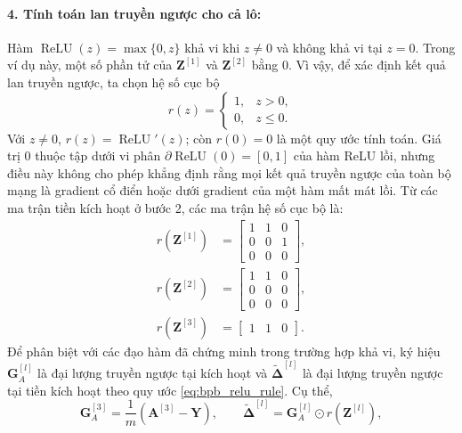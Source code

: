 \paragraph{4. Tính toán lan truyền ngược cho cả lô:}
Hàm $\operatorname{ReLU}(z)=\max\{0,z\}$ khả vi khi $z\neq 0$ và không khả vi tại $z=0$. Trong ví dụ này, một số phần tử của $\mathbf{Z}^{[1]}$ và $\mathbf{Z}^{[2]}$ bằng $0$. Vì vậy, để xác định kết quả lan truyền ngược, ta chọn hệ số cục bộ
\begin{equation}
r(z)=\begin{cases}1,&z>0,\\0,&z\leq 0.\end{cases}
\label{eq:bpb_relu_rule}
\end{equation}
Với $z\neq 0$, $r(z)=\operatorname{ReLU}'(z)$; còn $r(0)=0$ là một quy ước tính toán. Giá trị $0$ thuộc tập dưới vi phân $\partial\operatorname{ReLU}(0)=[0,1]$ của hàm ReLU lồi, nhưng điều này không cho phép khẳng định rằng mọi kết quả truyền ngược của toàn bộ mạng là gradient cổ điển hoặc dưới gradient của một hàm mất mát lồi. Từ các ma trận tiền kích hoạt ở bước 2, các ma trận hệ số cục bộ là:
\begin{align*}
r\!\left(\mathbf{Z}^{[1]}\right) &= \begin{bmatrix} 1 & 1 & 0 \\ 0 & 0 & 1 \\ 0 & 0 & 0 \end{bmatrix}, \\
r\!\left(\mathbf{Z}^{[2]}\right) &= \begin{bmatrix} 1 & 1 & 0 \\ 0 & 0 & 0 \\ 0 & 0 & 0 \end{bmatrix}, \\
r\!\left(\mathbf{Z}^{[3]}\right) &= \begin{bmatrix} 1 & 1 & 0 \end{bmatrix}.
\end{align*}
Để phân biệt với các đạo hàm đã chứng minh trong trường hợp khả vi, ký hiệu $\mathbf{G}_A^{[l]}$ là đại lượng truyền ngược tại kích hoạt và $\widetilde{\boldsymbol{\Delta}}^{[l]}$ là đại lượng truyền ngược tại tiền kích hoạt theo quy ước \eqref{eq:bpb_relu_rule}. Cụ thể,
\begin{equation}
\mathbf{G}_A^{[3]}=\frac{1}{m}(\mathbf{A}^{[3]}-\mathbf{Y}),
\qquad
\widetilde{\boldsymbol{\Delta}}^{[l]}=\mathbf{G}_A^{[l]}\odot r(\mathbf{Z}^{[l]}),
\label{eq:bpb_example_adjoint}
\end{equation}
